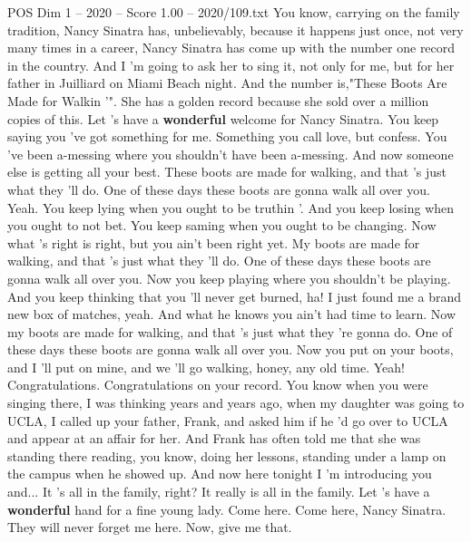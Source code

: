 \begin{textsample}{POS Dim 1 – 2020 – Score 1.00 – 2020/109.txt}  \label{ex:f1_pos_015}
You know, carrying on the family tradition, Nancy Sinatra has, unbelievably, because it happens just once, not very many times in a career, Nancy Sinatra has come up with the number one record in the country.
And I 'm going to ask her to sing it, not only for me, but for her father in Juilliard on Miami Beach night.
And the number is,"These Boots Are Made for Walkin '".
She has a golden record because she sold over a million copies of this.
Let 's have a \textbf{wonderful} welcome for Nancy Sinatra.
You keep saying you 've got something for me.
Something you call love, but confess.
You 've been a-messing where you shouldn't have been a-messing.
And now someone else is getting all your best.
These boots are made for walking, and that 's just what they 'll do.
One of these days these boots are gonna walk all over you.
Yeah.
You keep lying when you ought to be truthin '.
And you keep losing when you ought to not bet.
You keep saming when you ought to be changing.
Now what 's right is right, but you ain't been right yet.
My boots are made for walking, and that 's just what they 'll do.
One of these days these boots are gonna walk all over you.
Now you keep playing where you shouldn't be playing.
And you keep thinking that you 'll never get burned, ha!
I just found me a brand new box of matches, yeah.
And what he knows you ain't had time to learn.
Now my boots are made for walking, and that 's just what they 're gonna do.
One of these days these boots are gonna walk all over you.
Now you put on your boots, and I 'll put on mine, and we 'll go walking, honey, any old time.
Yeah!
Congratulations.
Congratulations on your record.
You know when you were singing there, I was thinking years and years ago, when my daughter was going to UCLA, I called up your father, Frank, and asked him if he 'd go over to UCLA and appear at an affair for her.
And Frank has often told me that she was standing there reading, you know, doing her lessons, standing under a lamp on the campus when he showed up.
And now here tonight I 'm introducing you and...
It 's all in the family, right?
It really is all in the family.
Let 's have a \textbf{wonderful} hand for a fine young lady.
Come here.
Come here, Nancy Sinatra.
They will never forget me here.
Now, give me that.

\end{textsample}
